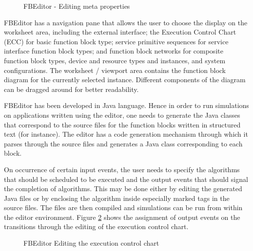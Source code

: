 %
\begin{figure}
\begin{center}
\caption[FBEditor - Editing meta properties]{FBEditor - Editing
meta properties{\protect ~\cite{FBEditor}}}
\label{f:Editor-Versions}
\end{center}
\end{figure}
%
FBEditor has a navigation pane that allows the user to choose the
display on the worksheet area, including the external interface;
the Execution Control Chart (ECC) for basic function block type;
service primitive sequences for service interface function block
types; and function block networks for composite function block
types, device and resource types and instances, and system
configurations. The worksheet / viewport area contains the
function block diagram for the currently selected instance.
Different components of the diagram can be dragged around for
better readability.


FBEditor has been developed in Java language. Hence in order to
run simulations on applications written using the editor, one
needs to generate the Java classes that correspond to the source
files for the function blocks written in structured text (for
instance). The editor has a code generation mechanism through
which it parses through the source files and generates a Java
class corresponding to each block.


On occurrence of certain input events, the user needs to specify
the algorithms that should be scheduled to be executed and the
output events that should signal the completion of algorithms.
This may be done either by editing the generated Java files or by
enclosing the algorithm inside especially marked tags in the
source files. The files are then compiled and simulations can be
run from within the editor environment. Figure
\ref{f:Editor-Transitions} shows the assignment of output events
on the transitions through the editing of the execution control
chart.

%
\begin{figure}
\begin{center}
\caption[FBEditor Editing the execution control chart]{FBEditor
Editing the execution control chart{\protect ~\cite{FBEditor}}}
\label{f:Editor-Transitions}
\end{center}
\end{figure}
%

